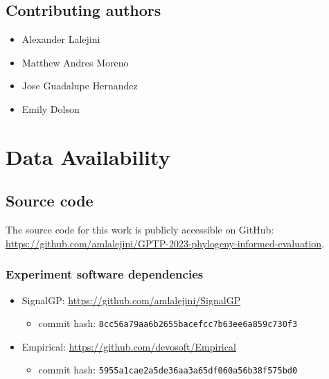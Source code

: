 \documentclass[
]{book}
\providecommand{\tightlist}{%
  \setlength{\itemsep}{0pt}\setlength{\parskip}{0pt}}
\begin{document}
\hypertarget{contributing-authors}{%
\section{Contributing authors}\label{contributing-authors}}

\begin{itemize}
\tightlist
\item
  Alexander Lalejini
\item
  Matthew Andres Moreno
\item
  Jose Guadalupe Hernandez
\item
  Emily Dolson
\end{itemize}

\hypertarget{data-availability}{%
\chapter{Data Availability}\label{data-availability}}

\hypertarget{source-code}{%
\section{Source code}\label{source-code}}

The source code for this work is publicly accessible on GitHub: \url{https://github.com/amlalejini/GPTP-2023-phylogeny-informed-evaluation}.

\hypertarget{experiment-software-dependencies}{%
\subsection{Experiment software dependencies}\label{experiment-software-dependencies}}

\begin{itemize}
\tightlist
\item
  SignalGP: \url{https://github.com/amlalejini/SignalGP}

  \begin{itemize}
  \tightlist
  \item
    commit hash: \texttt{8cc56a79aa6b2655bacefcc7b63ee6a859c730f3}
  \end{itemize}
\item
  Empirical: \url{https://github.com/devosoft/Empirical}

  \begin{itemize}
  \tightlist
  \item
    commit hash: \texttt{5955a1cae2a5de36aa3a65df060a56b38f575bd0}
  \end{itemize}
\end{itemize}
\end{document}
